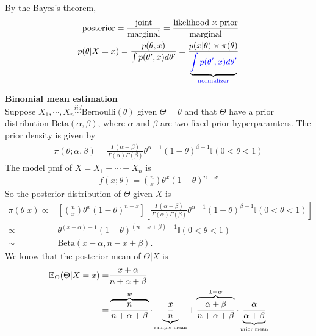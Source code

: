 \begin{note}
    By the Bayes's theorem,
    \begin{align}
        \text{posterior}
        =\frac{\text{joint}}{\text{marginal}}
        =\frac{\text{likelihood}\times\text{prior}}{\text{marginal}}\\
        p(\theta|X=x)
        =\frac{p(\theta,x)}{\int{p(\theta',x)}d\theta'}
        =\frac{p(x|\theta)\times\pi(\theta)}{\underbrace{\color{blue}\int{p(\theta',x)}d\theta'}_{\color{blue}\text{normalizer}}}
    \end{align}
\end{note}

\begin{example}
    \textbf{Binomial mean estimation}\\
    Suppose $X_1,\cdots,X_n\overset{iid}{\sim}\text{Bernoulli}(\theta)$ given $\Theta=\theta$
    and that $\Theta$ have a prior distribution $\text{Beta}(\alpha,\beta)$,
    where $\alpha$ and $\beta$ are two fixed prior hyperparamters. 
    The prior density is given by 
    \begin{gather}
        \pi(\theta;\alpha,\beta)
        =\frac{\Gamma(\alpha+\beta)}{\Gamma(\alpha)\Gamma(\beta)}\theta^{\alpha-1}(1-\theta)^{\beta-1}\mathbb{I}(0<\theta<1)
    \end{gather}
    The model pmf of $X=X_1+\cdots+X_n$ is 
    \begin{gather}
        f(x;\theta)=\binom{n}{x}\theta^x(1-\theta)^{n-x}
    \end{gather}
    So the posterior distribution of $\Theta$ given $X$ is 
    \begin{align}
        \pi(\theta|x)
        \propto& \left[
            \binom{n}{x}\theta^x(1-\theta)^{n-x}
        \right]\left[
            \frac{\Gamma(\alpha+\beta)}{\Gamma(\alpha)\Gamma(\beta)}\theta^{\alpha-1}(1-\theta)^{\beta-1}\mathbb{I}(0<\theta<1)
        \right]\\
        \propto& \theta^{(x-\alpha)-1}(1-\theta)^{(n-x+\beta)-1}\mathbb{I}(0<\theta<1)\\
        \sim& \text{Beta}(x-\alpha,n-x+\beta).
    \end{align}
    We know that the posterior mean of $\Theta|X$ is 
    \begin{align}
        \mathbb{E}_\Theta(\Theta|X=x)
        =&\frac{x+\alpha}{n+\alpha+\beta}\\
        =&\overbrace{\frac{n}{n+\alpha+\beta}}^{w}\cdot\underbrace{\frac{x}{n}}_{\text{\tiny sample mean}}
        +\overbrace{\frac{\alpha+\beta}{n+\alpha+\beta}}^{1-w}\cdot\underbrace{\frac{\alpha}{\alpha+\beta}}_{\text{\tiny prior mean}}
    \end{align}
\end{example}

